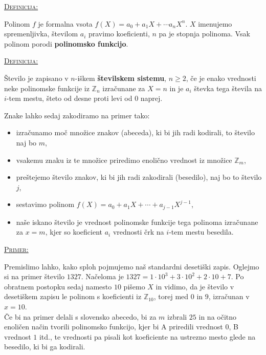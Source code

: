 \documentclass[a4paper, 12pt]{article} %
\newcommand{\Zn}{\mathbb{Z}_n}
\newenvironment{matematika}[1]{
\textcolor{bostonuniversityred}{\underline{\textsc{#1:}}}
}{
}
\begin{document}
\begin{matematika}{Definicija}
Polinom $f$ je formalna vsota $f(X) = a_0 + a_1 X + \cdots a_n X^n$. $X$ imenujemo spremenljivka, številom $a_i$ pravimo koeficienti, $n$ pa je stopnja polinoma. Vsak polinom porodi \textbf{polinomsko funkcijo}. \\
\end{matematika}

\begin{matematika}{Definicija}
Število je zapisano v $n$-iškem \textbf{številskem sistemu}, $n \geq 2$, če je enako vrednosti neke polinomske funkcije iz $\Zn$ izračunane za $X = n$ in je $a_i$ števka tega števila na $i$-tem mestu, šteto od desne proti levi od $0$ naprej. \\
\end{matematika}

Znake lahko sedaj zakodiramo na primer tako:
\begin{itemize}[label=]
\item izračunamo moč množice znakov (abeceda), ki bi jih radi kodirali, to število naj bo $m$,
\item vsakemu znaku iz te množice priredimo enolično vrednost iz množice $\mathbb{Z}_m$,
\item preštejemo število znakov, ki bi jih radi zakodirali (besedilo), naj bo to število $j$,
\item sestavimo polinom $f(X) = a_0 + a_1 X + \cdots + a_{j-1} X^{j-1}$,
\item naše iskano število je vrednost polinomske funkcije tega polinoma izračunane za $x=m$, kjer so koeficient $a_i$ vrednosti črk na $i$-tem mestu besedila.
\end{itemize}
\begin{matematika}{Primer}
Premislimo lahko, kako sploh pojmujemo naš standardni desetiški zapis. Oglejmo si na primer število $1327$. Načeloma je $1327 = 1 \cdot 10^3 + 3 \cdot 10^2 + 2 \cdot 10 + 7$. Po obratnem postopku sedaj namesto $10$ pišemo $X$ in vidimo, da je število v desetiškem zapisu le polinom s koeficienti iz $\mathbb{Z}_{10}$, torej med $0$ in $9$, izračunan v $x = 10$. \\
Če bi na primer delali s slovensko abecedo, bi za $m$ izbrali $25$ in na očitno enoličen način tvorili polinomsko funkcijo, kjer bi A priredili vrednost $0$, B vrednost $1$ itd., te vrednosti pa pisali kot koeficiente na ustrezno mesto glede na besedilo, ki bi ga kodirali. \\
\end{matematika}
\end{document}
